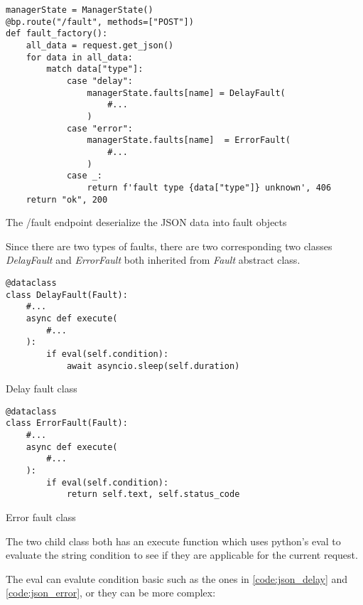 \begin{listing}[H]
  \begin{verbatim}
managerState = ManagerState()
@bp.route("/fault", methods=["POST"])
def fault_factory():
    all_data = request.get_json()
    for data in all_data:
        match data["type"]:
            case "delay":
                managerState.faults[name] = DelayFault(
                    #...
                )
            case "error":
                managerState.faults[name]  = ErrorFault(
                    #...
                )
            case _:
                return f'fault type {data["type"]} unknown', 406
    return "ok", 200
  \end{verbatim}
  \caption{The /fault endpoint deserialize the JSON data into fault objects}
\end{listing}


Since there are two types of faults, there are two corresponding two classes 
\textit{DelayFault} and \textit{ErrorFault} both inherited from \textit{Fault}
abstract class.

\begin{multicols}{2}
  \begin{listing}[H]
  \begin{verbatim}
@dataclass
class DelayFault(Fault):
    #...
    async def execute(
        #...
    ): 
        if eval(self.condition):
            await asyncio.sleep(self.duration)
  \end{verbatim}
  \caption{Delay fault class}
\end{listing}

  \columnbreak

  \begin{listing}[H]
  \begin{verbatim}
@dataclass
class ErrorFault(Fault):
    #...
    async def execute(
        #...
    ):
        if eval(self.condition):
            return self.text, self.status_code
  \end{verbatim}
  \caption{Error fault class}
\end{listing}
\end{multicols}

The two child class both has an execute function which uses python's eval to 
evaluate the string condition to see if they are applicable for the current request.

The eval can evalute condition basic such as the ones in \ref{code:json_delay} and
\ref{code:json_error}, or they can be more complex:

